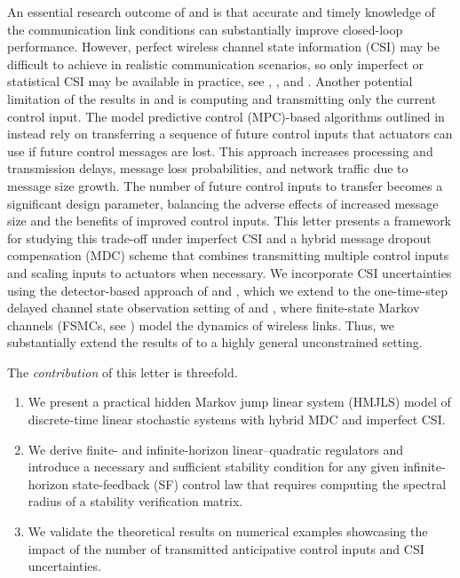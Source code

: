 \documentclass[journal,twoside,web]{ieeecolor}
\begin{document}
An essential research outcome of \cite{yZL-2025-automatica} and \cite{impicciatore2024tac} is that accurate and timely knowledge of the communication link conditions can substantially improve closed-loop performance. However, perfect wireless channel state information (CSI) may be difficult to achieve in realistic communication scenarios, so only imperfect or statistical CSI may be available in practice, see \cite{zheng2022survey}, \cite{pourkabirian2021robust}, and \cite{akgun2024interference}. Another potential limitation of the results in \cite{yZL-2025-automatica} and \cite{impicciatore2024tac} is computing and transmitting only the current control input. The model predictive control (MPC)-based algorithms outlined in \cite{pezzutto2024arc} instead rely on transferring a sequence of future control inputs that actuators can use if future control messages are lost. This approach increases processing and transmission delays, message loss probabilities, and network traffic due to message size growth. The number of future control inputs to transfer becomes a significant design parameter, balancing the adverse effects of increased message size and the benefits of improved control inputs. This letter presents a framework for studying this trade-off under imperfect CSI and a hybrid message dropout compensation (MDC) scheme that combines transmitting multiple control inputs and scaling inputs to actuators when necessary.
We incorporate CSI uncertainties using the detector-based approach of \cite{costa2015detector} and \cite{deoliveira2018mixed}, which we extend to the one-time-step delayed channel state observation setting of \cite{yZL-2025-automatica} and \cite{impicciatore2024tac}, where finite-state Markov channels (FSMCs, see \cite{sadeghi2008finite}) model the dynamics of wireless links. Thus, we substantially extend the results of \cite{yZL-2025-automatica} to a highly general unconstrained setting.

The \textit{contribution} of this letter is threefold.
\begin{enumerate}
    \item We present a practical hidden Markov jump linear system (HMJLS) model of discrete-time linear stochastic systems with hybrid MDC and imperfect CSI.
    \item We derive finite- and infinite-horizon linear–quadratic regulators %
    and introduce a necessary and sufficient stability condition for any given infinite-horizon state-feedback (SF) control law that requires computing the spectral radius of a stability verification matrix.
    \item We validate the theoretical results on numerical examples showcasing the impact of the number of transmitted anticipative control inputs and CSI uncertainties.
\end{enumerate}
\end{document}
